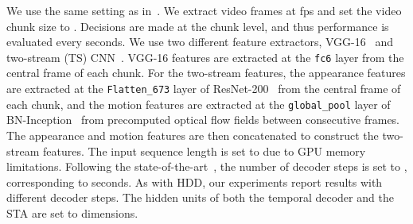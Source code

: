 We use the same setting as in~\cite{gao2017red}. We extract video
frames at  fps and set the video chunk size to . Decisions are
made at the chunk level, and thus performance is evaluated every 
seconds. We use two different feature extractors,
VGG-16~\cite{simonyan2014very} and two-stream (TS)
CNN~\cite{xiong2016cuhk}. VGG-16 features are extracted at the
\texttt{fc6} layer from the central frame of each chunk. For the
two-stream features, the appearance features are extracted at the
\texttt{Flatten\_673} layer of ResNet-200~\cite{he2016deep} from the
central frame of each chunk, and the motion features are extracted at
the \texttt{global\_pool} layer of BN-Inception~\cite{ioffe2015batch}
from precomputed optical flow fields between   consecutive
frames. The appearance and motion features are then concatenated to
construct the two-stream features. The input sequence length 
is set to   due to GPU memory limitations. Following the
state-of-the-art~\cite{gao2017red}, the number of decoder steps
 is set to , corresponding to  seconds.
As with HDD, our experiments report results with
different decoder steps. The hidden units of both the temporal decoder
and the STA are set to  dimensions.

